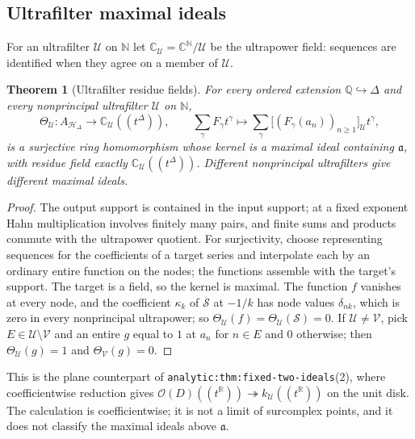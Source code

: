 \documentclass[11pt,letterpaper]{article}
\newtheorem{theorem}{Theorem}[section]
\theoremstyle{definition}
\theoremstyle{remark}
\newcommand{\C}{\mathbb C}
\newcommand{\R}{\mathbb R}
\newcommand{\Q}{\mathbb Q}
\newcommand{\N}{\mathbb N}
\newcommand{\OO}{\mathcal O}
\newcommand{\HD}{\mathscr H_\Delta}
\numberwithin{equation}{section}
\begin{document}
\subsection{Ultrafilter maximal ideals}

For an ultrafilter $\mathcal U$ on $\N$ let $\C_{\mathcal U}=\C^{\N}/\mathcal U$
be the ultrapower field: sequences are identified when they agree on a member
of $\mathcal U$.

\begin{theorem}[Ultrafilter residue fields]\label{nab:pl:thm:ultrafilter}
For every ordered extension $\Q\hookrightarrow\Delta$ and every nonprincipal
ultrafilter $\mathcal U$ on $\N$,
\begin{equation}\label{nab:pl:eq:ultrafilter}
 \Theta_{\mathcal U}:A_{\HD}\to\C_{\mathcal U}((t^\Delta)),\qquad
 \sum_\gamma F_\gamma t^\gamma\longmapsto
 \sum_\gamma\bigl[(F_\gamma(a_n))_{n\geq1}\bigr]_{\mathcal U}t^\gamma,
\end{equation}
is a surjective ring homomorphism whose kernel is a maximal ideal containing
$\mathfrak a$, with residue field exactly $\C_{\mathcal U}((t^\Delta))$.
Different nonprincipal ultrafilters give different maximal ideals.
\end{theorem}

\begin{proof}
The output support is contained in the input support; at a fixed exponent
Hahn multiplication involves finitely many pairs, and finite sums and products
commute with the ultrapower quotient. For surjectivity, choose representing
sequences for the coefficients of a target series and interpolate each by an
ordinary entire function on the nodes; the functions assemble with the target's
support. The target is a field, so the kernel is maximal. The function $f$
vanishes at every node, and the coefficient $\kappa_k$ of $\mathcal S$ at
$-1/k$ has node values $\delta_{nk}$, which is zero in every nonprincipal
ultrapower; so $\Theta_{\mathcal U}(f)=\Theta_{\mathcal U}(\mathcal S)=0$. If
$\mathcal U\neq\mathcal V$, pick $E\in\mathcal U\setminus\mathcal V$ and an
entire $g$ equal to $1$ at $a_n$ for $n\in E$ and $0$ otherwise; then
$\Theta_{\mathcal U}(g)=1$ and $\Theta_{\mathcal V}(g)=0$.
\end{proof}

This is the plane counterpart of \nolinkurl{analytic:thm:fixed-two-ideals}(2),
where coefficientwise reduction gives $\OO(D)((t^\R))\twoheadrightarrow
k_{\mathcal U}((t^\R))$ on the unit disk. The calculation is coefficientwise;
it is not a limit of surcomplex points, and it does not classify the maximal
ideals above $\mathfrak a$.
\end{document}
